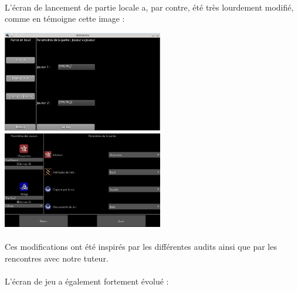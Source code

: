 \documentclass[11pt]{article} %
\begin{document}
\paragraph{}
L'écran de lancement de partie locale a, par contre, été très lourdement modifié, comme en témoigne cette image :

\begin{center}
\includegraphics[width=7cm]{snapshot4.png}
\includegraphics[width=7cm]{validDoc2.jpg}
\end{center}
\paragraph{}
Ces modifications ont été inspirés par les différentes audits ainsi que par les rencontres avec notre tuteur.
\paragraph{}
L'écran de jeu a également fortement évolué :
\end{document}
